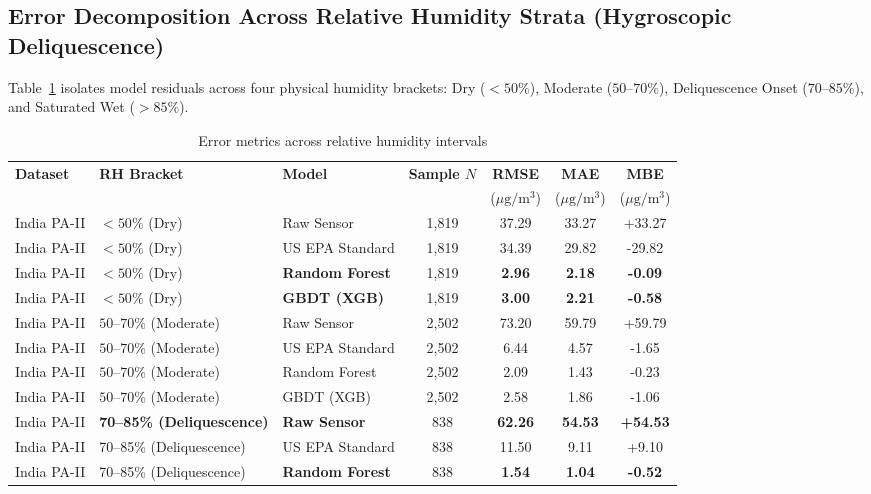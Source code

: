 \documentclass[11pt,a4paper]{article}
\begin{document}
\subsection{Error Decomposition Across Relative Humidity Strata (Hygroscopic Deliquescence)}
Table~\ref{tab:rh_strata} isolates model residuals across four physical humidity brackets: Dry ($<50\%$), Moderate ($50\text{--}70\%$), Deliquescence Onset ($70\text{--}85\%$), and Saturated Wet ($>85\%$).

\begin{table}[htbp]
\centering
\small
\caption{Error metrics across relative humidity intervals}
\label{tab:rh_strata}
\begin{tabularx}{\textwidth}{l l l c c c c}
\toprule
\textbf{Dataset} & \textbf{RH Bracket} & \textbf{Model} & \textbf{Sample $N$} & \textbf{RMSE} & \textbf{MAE} & \textbf{MBE} \\
& & & & ($\mu\text{g}/\text{m}^3$) & ($\mu\text{g}/\text{m}^3$) & ($\mu\text{g}/\text{m}^3$) \\
\midrule
India PA-II & $<50\%$ (Dry) & Raw Sensor & 1,819 & 37.29 & 33.27 & +33.27 \\
India PA-II & $<50\%$ (Dry) & US EPA Standard & 1,819 & 34.39 & 29.82 & -29.82 \\
India PA-II & $<50\%$ (Dry) & \textbf{Random Forest} & 1,819 & \textbf{2.96} & \textbf{2.18} & \textbf{-0.09} \\
India PA-II & $<50\%$ (Dry) & \textbf{GBDT (XGB)} & 1,819 & \textbf{3.00} & \textbf{2.21} & \textbf{-0.58} \\
\midrule
India PA-II & $50\text{--}70\%$ (Moderate) & Raw Sensor & 2,502 & 73.20 & 59.79 & +59.79 \\
India PA-II & $50\text{--}70\%$ (Moderate) & US EPA Standard & 2,502 & 6.44 & 4.57 & -1.65 \\
India PA-II & $50\text{--}70\%$ (Moderate) & Random Forest & 2,502 & 2.09 & 1.43 & -0.23 \\
India PA-II & $50\text{--}70\%$ (Moderate) & GBDT (XGB) & 2,502 & 2.58 & 1.86 & -1.06 \\
\midrule
India PA-II & \textbf{70--85\% (Deliquescence)} & \textbf{Raw Sensor} & 838 & \textbf{62.26} & \textbf{54.53} & \textbf{+54.53} \\
India PA-II & 70--85\% (Deliquescence) & US EPA Standard & 838 & 11.50 & 9.11 & +9.10 \\
India PA-II & 70--85\% (Deliquescence) & \textbf{Random Forest} & 838 & \textbf{1.54} & \textbf{1.04} & \textbf{-0.52} \\

\end{tabularx}
\end{table}
\end{document}
